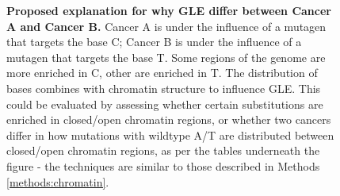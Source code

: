 \begin{figure}[ht!]
  \begin{minipage}[c]{\textwidth}
    \caption{
      \textbf{Proposed explanation for why GLE differ between Cancer A and Cancer B.} Cancer A is under the influence of a mutagen that targets the base C; Cancer B is under the influence of a mutagen that targets the base T. Some regions of the genome are more enriched in C, other are enriched in T. The distribution of bases combines with chromatin structure to influence GLE. This could be evaluated by assessing whether certain substitutions are enriched in closed/open chromatin regions, or whether two cancers differ in how mutations with wildtype A/T are distributed between closed/open chromatin regions, as per the tables underneath the figure - the techniques are similar to those described in Methods \ref{methods:chromatin}.
    } \label{fig:discussion_gle}
  \end{minipage}
\end{figure}

